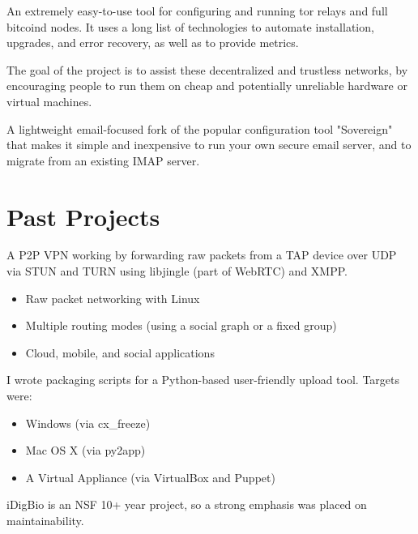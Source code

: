 \documentclass[11pt, letterpaper]{article}
\begin{document}
An extremely easy-to-use tool for configuring and running tor relays and full
bitcoind nodes. It uses a long list of technologies to automate installation,
upgrades, and error recovery, as well as to provide metrics.

The goal of the project is to assist these decentralized and trustless networks,
by encouraging people to run them on cheap and potentially unreliable hardware
or virtual machines.


A lightweight email-focused fork of the popular configuration tool "Sovereign"
that makes it simple and inexpensive to run your own secure email server, and to
migrate from an existing IMAP server.

\vfill

\section{Past Projects}

A P2P VPN working by forwarding raw packets from a TAP device over UDP via
STUN and TURN using libjingle (part of WebRTC) and XMPP.

\begin{itemize}
    \item Raw packet networking with Linux
    \item Multiple routing modes (using a social graph or a fixed group)
    \item Cloud, mobile, and social applications
\end{itemize}%


I wrote packaging scripts for a Python-based user-friendly upload tool. Targets
were:

\begin{itemize}
    \item Windows (via cx\_freeze)
    \item Mac OS X (via py2app)
    \item A Virtual Appliance (via VirtualBox and Puppet)
\end{itemize}

iDigBio is an NSF 10+ year project, so a strong emphasis was placed on
maintainability.

\pagebreak

\end{document}
